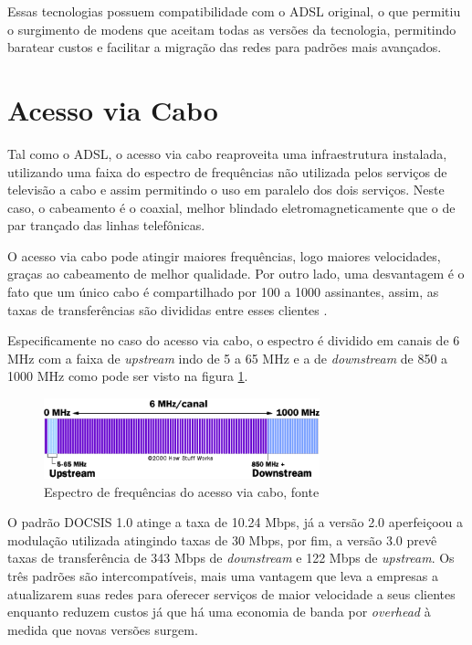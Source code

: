 \documentclass[brazil,times,12pt]{abnt}
\begin{document}
Essas tecnologias possuem compatibilidade com o ADSL original, o que permitiu o
surgimento de modens que aceitam todas as versões da tecnologia, permitindo
baratear custos e facilitar a migração das redes para padrões mais avançados.


\section*{Acesso via Cabo}
Tal como o ADSL, o acesso via cabo reaproveita uma infraestrutura instalada,
utilizando uma faixa do espectro de frequências não utilizada pelos serviços de
televisão a cabo e assim permitindo o uso em paralelo dos dois serviços. Neste
caso, o cabeamento é o coaxial, melhor blindado eletromagneticamente que o de
par trançado das linhas telefônicas.

O acesso via cabo pode atingir maiores frequências, logo
maiores velocidades, graças ao cabeamento de melhor qualidade. Por outro
lado, uma desvantagem é o fato que um único cabo é compartilhado por 100 a 1000
assinantes, assim, as taxas de transferências são divididas entre esses clientes
\cite{morimoto:opcoes-acesso}.

Especificamente no caso do acesso via cabo, o espectro é dividido em canais de 6
MHz com a faixa de \emph{upstream} indo de 5 a 65 MHz e a de \emph{downstream}
de 850 a 1000 MHz como pode ser visto na figura \ref{espectro-cable-modem}.
\cite{hsw:cable-modem}

\begin{figure}[htp]
\begin{center}
  \includegraphics[width=80mm]{imagens/cable-modem-frequency.png}
  \caption[Espectro de frequências do acesso via cabo, fonte
  \cite{hsw:cable-modem}]{Espectro de frequências do acesso via cabo, fonte
  \cite{hsw:cable-modem}}
  \label{espectro-cable-modem}
\end{center}
\end{figure}

O padrão DOCSIS 1.0 atinge a taxa de 10.24 Mbps, já a versão 2.0 aperfeiçoou a
modulação utilizada atingindo taxas de 30 Mbps, por fim, a versão 3.0 prevê
taxas de transferência de 343 Mbps de \emph{downstream} e 122 Mbps de
\emph{upstream}. Os três padrões são intercompatíveis, mais uma vantagem que
leva a empresas a atualizarem suas redes para oferecer serviços de maior
velocidade a seus clientes enquanto reduzem custos já que há uma economia de
banda por \emph{overhead} à medida que novas versões surgem.
\cite{enwiki:docsis} \cite{morimoto:opcoes-acesso}
\end{document}
